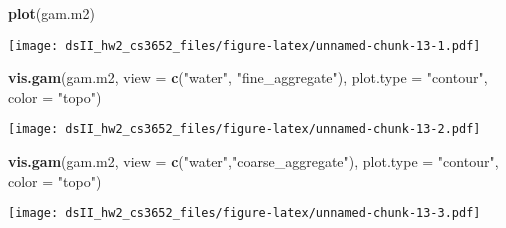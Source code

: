 \documentclass[]{article}
\newenvironment{Shaded}{\begin{snugshade}}{\end{snugshade}}
\newcommand{\KeywordTok}[1]{\textcolor[rgb]{0.13,0.29,0.53}{\textbf{#1}}}
\newcommand{\DataTypeTok}[1]{\textcolor[rgb]{0.13,0.29,0.53}{#1}}
\newcommand{\StringTok}[1]{\textcolor[rgb]{0.31,0.60,0.02}{#1}}
\newcommand{\NormalTok}[1]{#1}
\begin{document}
\begin{Shaded}
\begin{Highlighting}[]
\KeywordTok{plot}\NormalTok{(gam.m2)}
\end{Highlighting}
\end{Shaded}

\texttt{[image: dsII\_hw2\_cs3652\_files/figure-latex/unnamed-chunk-13-1.pdf]}

\begin{Shaded}
\begin{Highlighting}[]
\KeywordTok{vis.gam}\NormalTok{(gam.m2, }\DataTypeTok{view =} \KeywordTok{c}\NormalTok{(}\StringTok{"water"}\NormalTok{, }\StringTok{"fine_aggregate"}\NormalTok{), }
        \DataTypeTok{plot.type =} \StringTok{"contour"}\NormalTok{, }\DataTypeTok{color =} \StringTok{"topo"}\NormalTok{)}
\end{Highlighting}
\end{Shaded}

\texttt{[image: dsII\_hw2\_cs3652\_files/figure-latex/unnamed-chunk-13-2.pdf]}

\begin{Shaded}
\begin{Highlighting}[]
\KeywordTok{vis.gam}\NormalTok{(gam.m2, }\DataTypeTok{view =} \KeywordTok{c}\NormalTok{(}\StringTok{"water"}\NormalTok{,}\StringTok{"coarse_aggregate"}\NormalTok{),}
        \DataTypeTok{plot.type =} \StringTok{"contour"}\NormalTok{, }\DataTypeTok{color =} \StringTok{"topo"}\NormalTok{)}
\end{Highlighting}
\end{Shaded}

\texttt{[image: dsII\_hw2\_cs3652\_files/figure-latex/unnamed-chunk-13-3.pdf]}
\end{document}

